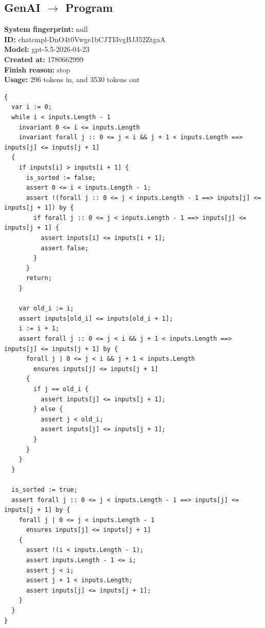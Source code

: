 \documentclass{article}
\begin{document}
\subsection*{GenAI $\rightarrow$ Program}
\textbf{System fingerprint: }null
\\\textbf{ID: }chatcmpl-DnO4t0Vwge1bCJTI3vgBJJ52ZtgaA
\\\textbf{Model: }gpt-5.5-2026-04-23
\\\textbf{Created at: }1780662999
\\\textbf{Finish reason: }stop
\\\textbf{Usage: }296 tokens in, and 3530 tokens out
\begin{lstlisting}
{
  var i := 0;
  while i < inputs.Length - 1
    invariant 0 <= i <= inputs.Length
    invariant forall j :: 0 <= j < i && j + 1 < inputs.Length ==> inputs[j] <= inputs[j + 1]
  {
    if inputs[i] > inputs[i + 1] {
      is_sorted := false;
      assert 0 <= i < inputs.Length - 1;
      assert !(forall j :: 0 <= j < inputs.Length - 1 ==> inputs[j] <= inputs[j + 1]) by {
        if forall j :: 0 <= j < inputs.Length - 1 ==> inputs[j] <= inputs[j + 1] {
          assert inputs[i] <= inputs[i + 1];
          assert false;
        }
      }
      return;
    }

    var old_i := i;
    assert inputs[old_i] <= inputs[old_i + 1];
    i := i + 1;
    assert forall j :: 0 <= j < i && j + 1 < inputs.Length ==> inputs[j] <= inputs[j + 1] by {
      forall j | 0 <= j < i && j + 1 < inputs.Length
        ensures inputs[j] <= inputs[j + 1]
      {
        if j == old_i {
          assert inputs[j] <= inputs[j + 1];
        } else {
          assert j < old_i;
          assert inputs[j] <= inputs[j + 1];
        }
      }
    }
  }

  is_sorted := true;
  assert forall j :: 0 <= j < inputs.Length - 1 ==> inputs[j] <= inputs[j + 1] by {
    forall j | 0 <= j < inputs.Length - 1
      ensures inputs[j] <= inputs[j + 1]
    {
      assert !(i < inputs.Length - 1);
      assert inputs.Length - 1 <= i;
      assert j < i;
      assert j + 1 < inputs.Length;
      assert inputs[j] <= inputs[j + 1];
    }
  }
}
\end{lstlisting}
\end{document}
